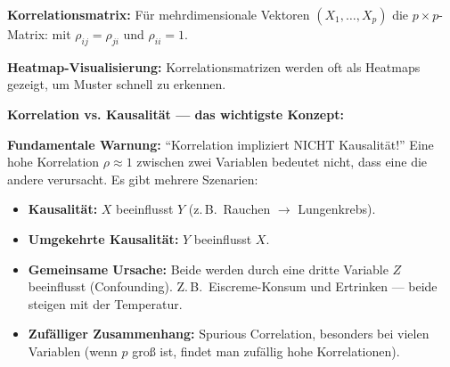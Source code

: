 \textbf{Korrelationsmatrix:} Für mehrdimensionale Vektoren $(X_1, \ldots, X_p)$ die $p \times p$-Matrix:
mit $\rho_{ij} = \rho_{ji}$ und $\rho_{ii} = 1$.

\textbf{Heatmap-Visualisierung:} Korrelationsmatrizen werden oft als Heatmaps gezeigt, um Muster schnell zu erkennen.


\textbf{Korrelation vs. Kausalität — das wichtigste Konzept:}

\textbf{Fundamentale Warnung:} ``Korrelation impliziert NICHT Kausalität!'' Eine hohe Korrelation $\rho \approx 1$ zwischen zwei Variablen bedeutet nicht, dass eine die andere verursacht. Es gibt mehrere Szenarien:
\begin{itemize}[leftmargin=1.5em]
    \item \textbf{Kausalität:} $X$ beeinflusst $Y$ (z.\,B.\ Rauchen $\to$ Lungenkrebs).
    \item \textbf{Umgekehrte Kausalität:} $Y$ beeinflusst $X$.
    \item \textbf{Gemeinsame Ursache:} Beide werden durch eine dritte Variable $Z$ beeinflusst (Confounding). Z.\,B.\ Eiscreme-Konsum und Ertrinken — beide steigen mit der Temperatur.
    \item \textbf{Zufälliger Zusammenhang:} Spurious Correlation, besonders bei vielen Variablen (wenn $p$ groß ist, findet man zufällig hohe Korrelationen).
\end{itemize}

